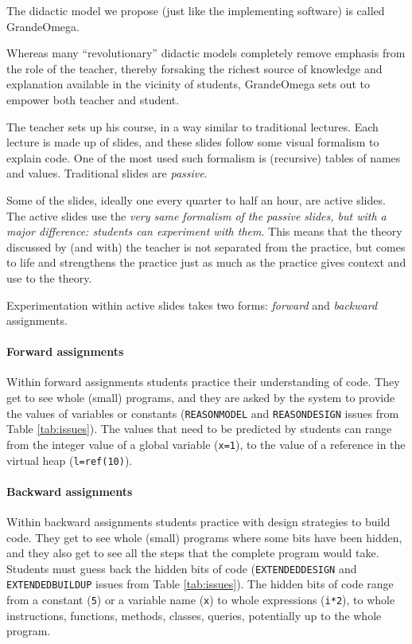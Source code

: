 The didactic model we propose (just like the implementing software) is called GrandeOmega.

Whereas many “revolutionary” didactic models completely remove emphasis from the role of the teacher, thereby forsaking the richest source of knowledge and explanation available in the vicinity of students, GrandeOmega sets out to empower both teacher and student. 

The teacher sets up his course, in a way similar to traditional lectures. Each lecture is made up of slides, and these slides follow some visual formalism to explain code. One  of the most used such formalism is (recursive) tables of names and values. Traditional slides are \textit{passive}.

Some of the slides, ideally one every quarter to half an hour, are active slides. The active slides use the \textit{very same formalism of the passive slides, but with a major difference: students can experiment with them}. This means that the theory discussed by (and with) the teacher is not separated from the practice, but comes to life and strengthens the practice just as much as the practice gives context and use to the theory.

Experimentation within active slides takes two forms: \textit{forward} and \textit{backward} assignments.

\paragraph{Forward assignments}
Within forward assignments students practice their understanding of code. They get to see whole (small) programs, and they are asked by the system to provide the values of variables or constants (\texttt{REASON\textunderscore MODEL} and \texttt{REASON\textunderscore DESIGN} issues from Table \ref{tab:issues}). The values that need to be predicted by students can range from the integer value of a global variable (\texttt{x=1}), to the value of a reference in the virtual heap (\texttt{l=ref(10)}).

\paragraph{Backward assignments}
Within backward assignments students practice with design strategies to build code. They get to see whole (small) programs where some bits have been hidden, and they also get to see all the steps that the complete program would take. Students must guess back the hidden bits of code (\texttt{EXTENDED\textunderscore DESIGN} and \texttt{EXTENDED\textunderscore BUILDUP} issues from Table \ref{tab:issues}). The hidden bits of code range from a constant (\texttt{5}) or a variable name (\texttt{x}) to whole expressions (\texttt{i*2}), to whole instructions, functions, methods, classes, queries, potentially up to the whole program.

